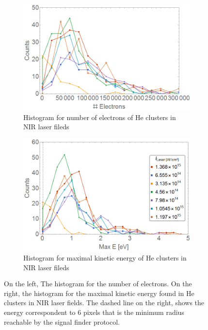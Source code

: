 \begin{figure}[h!]
\centering
\begin{subfigure}[l]{0.49\textwidth}\caption{Histogram for number of electrons of He clusters in NIR laser fileds}
\includegraphics[width=1\textwidth]{../Images/results/NIR_He_intensityscan/Helec.png}   				\end{subfigure}
\begin{subfigure}[l]{0.49\textwidth}\caption{Histogram for maximal kinetic energy of He clusters in NIR laser fileds}
\includegraphics[width=1\textwidth]{../Images/results/NIR_He_intensityscan/Henerg.png} 
\end{subfigure}

\caption[NIR He Intensity dependence. Histograms]{On the left, The histogram for the number of electrons. On the right, the histogram for the maximal kinetic energy found in He clusters in NIR laser fields.  The dashed line on the right, shows the energy correspondent to 6 pixels that is the minimum radius reachable by the signal finder protocol.}
\label{fig:NIRHehisto}
\end{figure}

